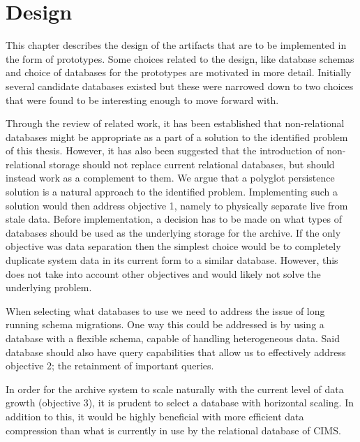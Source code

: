 \chapter{Design}
\label{chap:design}


This chapter describes the design of the artifacts that are to be implemented in the form of prototypes. Some choices related to the design, like database schemas and choice of databases for the prototypes are motivated in more detail. Initially several candidate databases existed but these were narrowed down to two choices that were found to be interesting enough to move forward with. 

Through the review of related work, it has been established that non-relational databases might be appropriate as a part of a solution to the identified problem of this thesis. However, it has also been suggested \cite{NoSQLSurvey} that the introduction of non-relational storage should not replace current relational databases, but should instead work as a complement to them. We argue that a polyglot persistence solution is a natural approach to the identified problem. Implementing such a solution would then address objective 1, namely to physically separate live from stale data. Before implementation, a decision has to be made on what types of databases should be used as the underlying storage for the archive. If the only objective was data separation then the simplest choice would be to completely duplicate system data in its current form to a similar database. However, this does not take into account other objectives and would likely not solve the underlying problem. 

When selecting what databases to use we need to address the issue of long running schema migrations. One way this could be addressed is by using a database with a flexible schema, capable of handling heterogeneous data. Said database should also have query capabilities that allow us to effectively address objective 2; the retainment of important queries.

In order for the archive system to scale naturally with the current level of data growth (objective 3), it is prudent to select a database with horizontal scaling. In addition to this, it would be highly beneficial with more efficient data compression than what is currently in use by the relational database of CIMS.

